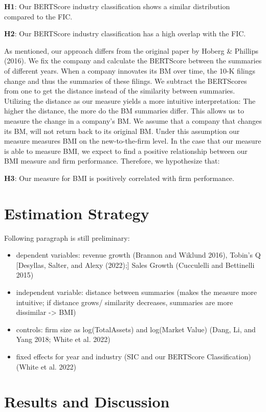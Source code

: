 \documentclass[
]{article}
\providecommand{\tightlist}{%
  \setlength{\itemsep}{0pt}\setlength{\parskip}{0pt}}\usepackage{longtable,booktabs,array}
\begin{document}
\textbf{H1}: Our BERTScore industry classification shows a similar
distribution compared to the FIC.

\textbf{H2}: Our BERTScore industry classification has a high overlap
with the FIC.

As mentioned, our approach differs from the original paper by Hoberg \&
Phillips (2016). We fix the company and calculate the BERTScore between
the summaries of different years. When a company innovates its BM over
time, the 10-K filings change and thus the summaries of these filings.
We subtract the BERTScores from one to get the distance instead of the
similarity between summaries. Utilizing the distance as our measure
yields a more intuitive interpretation: The higher the distance, the
more do the BM summaries differ. This allows us to measure the change in
a company's BM. We assume that a company that changes its BM, will not
return back to its original BM. Under this assumption our measure
measures BMI on the new-to-the-firm level. In the case that our measure
is able to measure BMI, we expect to find a positive relationship
between our BMI measure and firm performance. Therefore, we hypothesize
that:

\textbf{H3}: Our measure for BMI is positively correlated with firm
performance.

\section{Estimation Strategy}\label{estimation-strategy}

Following paragraph is still preliminary:

\begin{itemize}
\tightlist
\item
  dependent variables: revenue growth (Brannon and Wiklund 2016),
  Tobin's Q {[}Desyllas, Salter, and Alexy (2022);{]} Sales Growth
  (Cucculelli and Bettinelli 2015)
\item
  independent variable: distance between summaries (makes the measure
  more intuitive; if distance grows/ similarity decreases, summaries are
  more dissimilar -\textgreater{} BMI)
\item
  controls: firm size as log(TotalAssets) and log(Market Value) (Dang,
  Li, and Yang 2018; White et al. 2022)
\item
  fixed effects for year and industry (SIC and our BERTScore
  Classification) (White et al. 2022)
\end{itemize}

\section{Results and Discussion}\label{results-and-discussion}
\end{document}
